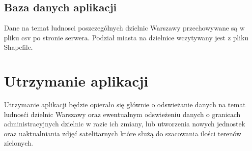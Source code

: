 \documentclass[11pt]{article}
\begin{document}
	\subsection{Baza danych aplikacji}
	Dane na temat ludnosci poszczególnych dzielnic Warszawy przechowywane są w pliku csv po stronie serwera. Podział miasta na dzielnice wczytywany jest z pliku Shapefile.

	\section{Utrzymanie aplikacji}
		Utrzymanie aplikacji będzie opierało się głównie o odswieżanie danych na temat ludnosći dzielnic Warszawy oraz ewentualnym odswieżeniu danych o granicach administracyjnych dzielnic w razie ich zmiany, lub utworzenia nowych jednostek oraz uaktualniania zdjęć satelitarnych które służą do szacowania ilości terenów zielonych.
\end{document}
